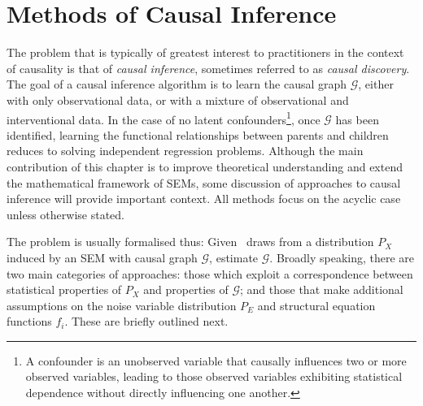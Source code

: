 \section{Methods of Causal Inference}\label{section:causality-causal-inference}
The problem that is typically of greatest interest to practitioners in the context of causality is that of \emph{causal inference}, sometimes referred to as \emph{causal discovery}.
The goal of a causal inference algorithm is to learn the causal graph $\mathcal{G}$, 
either with only observational data, or with a mixture of observational and interventional data.
In the case of no latent confounders\footnote{A confounder is an unobserved variable that causally influences two or more observed variables, leading to those observed variables exhibiting statistical dependence without directly influencing one another.}, once $\mathcal{G}$ has been identified, learning the functional relationships between parents and children reduces to solving independent regression problems. 
Although the main contribution of this chapter is to improve theoretical understanding and extend the mathematical framework of SEMs, some discussion of approaches to causal inference will provide important context.
All methods focus on the acyclic case unless otherwise stated.


The problem is usually formalised thus: Given \iid~draws from a distribution $P_X$ induced by an SEM with causal graph $\mathcal{G}$, estimate $\mathcal{G}$.
Broadly speaking, there are two main categories of approaches: those which exploit a correspondence between statistical properties of $P_X$ and properties of $\mathcal{G}$; and those that make additional assumptions on the noise variable distribution $P_E$ and structural equation functions $f_i$.
These are briefly outlined next.

